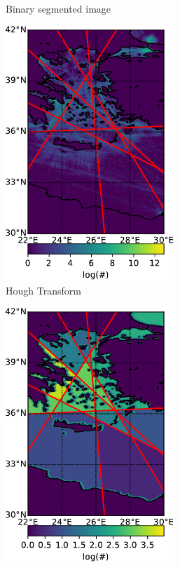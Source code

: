 \documentclass{article}
\begin{document}
\begin{figure}[h]
\begin{subfigure}[b]{0.5\linewidth}
    \caption{Binary segmented image} 
    \label{fig7:b} 
    \vspace{13ex}
    \end{subfigure} 
  \begin{subfigure}[b]{0.5\linewidth}
    \centering
    \includegraphics[width=0.7\textwidth]{AGEAN_DCRON_lines-crop.pdf} 
    \caption{Hough Transform} 
    \label{fig7:c} 
  \end{subfigure}%
  \begin{subfigure}[b]{0.5\linewidth}
    \centering
    \includegraphics[width=0.7\textwidth]{AGEAN_DCRON_segmented-crop.pdf} 

\end{subfigure}
\end{figure}
\end{document}
